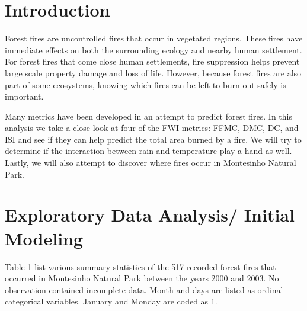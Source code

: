 \documentclass[11pt]{report}
\begin{document}
\newpage
\phantom{1}
\newpage

\section*{Introduction}

Forest fires are uncontrolled fires that occur in vegetated regions. These fires have immediate effects on both the surrounding ecology and nearby human settlement. For forest fires that come close human settlements, fire suppression helps prevent large scale property damage and loss of life. However, because forest fires are also part of some ecosystems, knowing which fires can be left to burn out safely is important.

Many metrics have been developed in an attempt to predict forest fires. In this analysis we take a close look at four of the FWI metrics: FFMC, DMC, DC, and ISI and see if they can help predict the total area burned by a fire. We will try to determine if the interaction between rain and temperature play a hand as well. Lastly, we will also attempt to discover where fires occur in Montesinho Natural Park.


\section*{Exploratory Data Analysis/ Initial Modeling}
Table 1 list various summary statistics of the 517 recorded forest fires that occurred in  Montesinho Natural Park between the years 2000 and 2003. No observation contained incomplete data. Month and days are listed as ordinal categorical variables. January and Monday are coded as 1.
\end{document}
